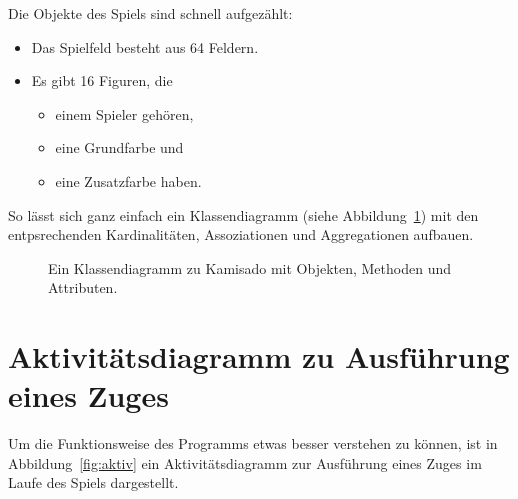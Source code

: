 \documentclass[
	12pt,
	halfparskip,
	a4paper,
	abstract,
	bibliography=totoc,
	liststotoc
]{scrreprt}
\begin{document}
\begin{samepage}
Die Objekte des Spiels sind schnell aufgezählt:
\begin{itemize}
\item Das Spielfeld besteht aus 64 Feldern.
\item Es gibt 16 Figuren, die
\begin{itemize}
\item einem Spieler gehören,
\item eine Grundfarbe und
\item eine Zusatzfarbe haben.
\end{itemize}
\end{itemize}
\end{samepage}

So lässt sich ganz einfach ein Klassendiagramm (siehe Abbildung~\ref{fig:klassendiagramm}) mit den entpsrechenden Kardinalitäten, Assoziationen und Aggregationen aufbauen.

\begin{figure}[htb]
\begin{center}
\end{center}
\caption{Ein Klassendiagramm zu Kamisado mit Objekten, Methoden und Attributen.}
\label{fig:klassendiagramm}
\end{figure}

\section{Aktivitätsdiagramm zu Ausführung eines Zuges}

Um die Funktionsweise des Programms etwas besser verstehen zu können, ist in Abbildung~\ref{fig:aktiv} ein Aktivitätsdiagramm zur Ausführung eines Zuges im Laufe des Spiels dargestellt.
\end{document}
